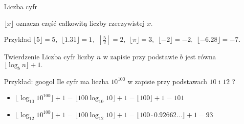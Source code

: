 \documentclass[a4paper,10pt]{beamer}
\begin{document}
\begin{frame}{Liczba cyfr}
	
	\begin{block}{}
		$\lfloor x\rfloor$ oznacza część całkowitą liczby rzeczywistej $x$.
	\end{block}
	
	\begin{exampleblock}{Przykład}
		$\displaystyle\lfloor5\rfloor=5,\ \ \lfloor1.31\rfloor=1,\ \ \left\lfloor\frac52\right\rfloor=2,\ \ \lfloor\pi\rfloor=3,\ \ \lfloor-2\rfloor=-2,\ \ \lfloor-6.28\rfloor=-7.$
	\end{exampleblock}
	
	\begin{block}{Twierdzenie}
		Liczba cyfr liczby $n$ w zapisie przy podstawie $b$ jest równa $\lfloor\log_bn\rfloor+1.$
	\end{block}

	\begin{exampleblock}{Przykład: googol}
		Ile cyfr ma liczba $10^{100}$ w zapisie przy podstawach $10$ i $12$ ?
		\begin{itemize}
			\item $\displaystyle \lfloor\log_{10}10^{100}\rfloor+1=\lfloor100\log_{10}{10}\rfloor+1=\lfloor100\rfloor+1=101$
			\item $\displaystyle \lfloor\log_{12}10^{100}\rfloor+1=\lfloor100\log_{12}{10}\rfloor+1=\lfloor100\cdot0.92662\ldots\rfloor+1=93$
		\end{itemize}
	\end{exampleblock}
\end{frame}
\end{document}
